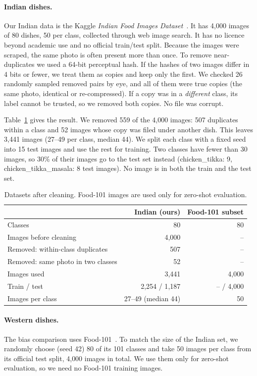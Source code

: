 \documentclass[twoside,a4paper,11pt]{article}
\begin{document}
\paragraph{Indian dishes.} Our Indian data is the Kaggle \emph{Indian Food Images Dataset}~\cite{banerjee2022indianfood}.
It has 4{,}000 images of 80 dishes, 50 per class, collected through web image search. It has no licence beyond
academic use and no official train/test split. Because the images were scraped, the same photo is often present more
than once. To remove near-duplicates we used a 64-bit perceptual hash. If the hashes of two images differ in 4 bits or
fewer, we treat them as copies and keep only the first. We checked 26 randomly sampled removed pairs by eye, and all of
them were true copies (the same photo, identical or re-compressed). If a copy was in a \emph{different} class, its label
cannot be trusted, so we removed both copies. No file was corrupt.

Table~\ref{tab:data} gives the result. We removed 559 of the 4{,}000 images: 507 duplicates within a class and 52
images whose copy was filed under another dish. This leaves 3{,}441 images (27--49 per class, median 44). We split each
class with a fixed seed into 15 test images and use the rest for training. Two classes have fewer than 30 images, so
30\% of their images go to the test set instead (chicken\_tikka: 9, chicken\_tikka\_masala: 8 test images). No image
is in both the train and the test set.

\begin{table}[h]
\centering
\begin{tabular}{lrr}
\toprule
 & Indian (ours) & Food-101 subset \\
\midrule
Classes & 80 & 80 \\
Images before cleaning & 4{,}000 & -- \\
Removed: within-class duplicates & 507 & -- \\
Removed: same photo in two classes & 52 & -- \\
Images used & 3{,}441 & 4{,}000 \\
Train / test & 2{,}254 / 1{,}187 & -- / 4{,}000 \\
Images per class & 27--49 (median 44) & 50 \\
\bottomrule
\end{tabular}
\caption{Datasets after cleaning. Food-101 images are used only for zero-shot evaluation.}
\label{tab:data}
\end{table}

\paragraph{Western dishes.} The bias comparison uses Food-101~\cite{bossard2014food101}. To match the size of the
Indian set, we randomly choose (seed 42) 80 of its 101 classes and take 50 images per class from its official test
split, 4{,}000 images in total. We use them only for zero-shot evaluation, so we need no Food-101 training images.
\end{document}
